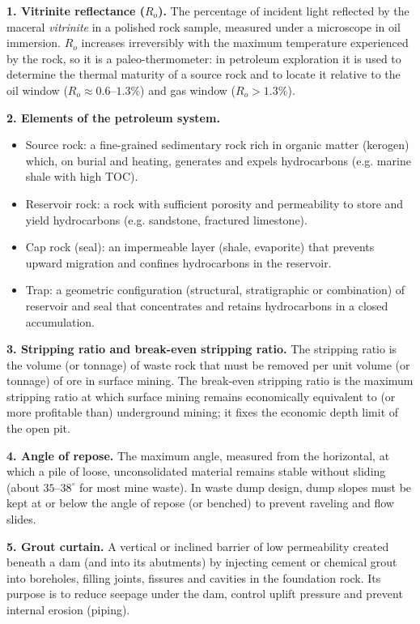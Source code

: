 \documentclass[11pt]{article}
\newcommand{\cle}[1]{{\popxbold\color{popdark}#1}}
\begin{document}
\begin{corrige}
\textbf{1. Vitrinite reflectance ($R_o$).} The percentage of incident light reflected by the maceral \emph{vitrinite} in a polished rock sample, measured under a microscope in oil immersion. $R_o$ increases irreversibly with the maximum temperature experienced by the rock, so it is a \cle{paleo-thermometer}: in petroleum exploration it is used to determine the thermal maturity of a source rock and to locate it relative to the oil window ($R_o \approx 0.6$--$1.3\%$) and gas window ($R_o > 1.3\%$).

\textbf{2. Elements of the petroleum system.}
\begin{itemize}
\item \cle{Source rock}: a fine-grained sedimentary rock rich in organic matter (kerogen) which, on burial and heating, generates and expels hydrocarbons (e.g. marine shale with high TOC).
\item \cle{Reservoir rock}: a rock with sufficient porosity and permeability to store and yield hydrocarbons (e.g. sandstone, fractured limestone).
\item \cle{Cap rock (seal)}: an impermeable layer (shale, evaporite) that prevents upward migration and confines hydrocarbons in the reservoir.
\item \cle{Trap}: a geometric configuration (structural, stratigraphic or combination) of reservoir and seal that concentrates and retains hydrocarbons in a closed accumulation.
\end{itemize}

\textbf{3. Stripping ratio and break-even stripping ratio.} The \cle{stripping ratio} is the volume (or tonnage) of waste rock that must be removed per unit volume (or tonnage) of ore in surface mining. The \cle{break-even stripping ratio} is the maximum stripping ratio at which surface mining remains economically equivalent to (or more profitable than) underground mining; it fixes the economic depth limit of the open pit.

\textbf{4. Angle of repose.} The maximum angle, measured from the horizontal, at which a pile of loose, unconsolidated material remains stable without sliding (about $35$--$38^\circ$ for most mine waste). In waste dump design, dump slopes must be kept at or below the angle of repose (or benched) to prevent raveling and flow slides.

\textbf{5. Grout curtain.} A vertical or inclined barrier of low permeability created beneath a dam (and into its abutments) by injecting cement or chemical grout into boreholes, filling joints, fissures and cavities in the foundation rock. Its purpose is to reduce seepage under the dam, control uplift pressure and prevent internal erosion (piping).
\end{corrige}
\end{document}
